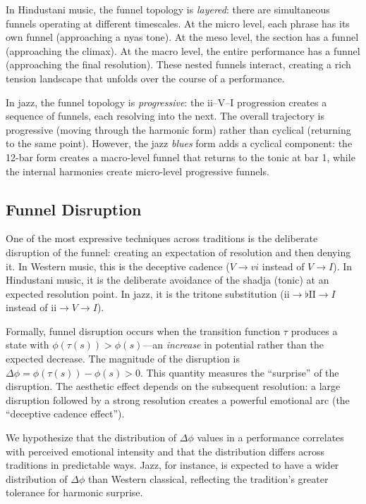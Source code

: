 \documentclass[cmj]{article}
\begin{document}
In Hindustani music, the funnel topology is \emph{layered}: there are
simultaneous funnels operating at different timescales. At the micro level,
each phrase has its own funnel (approaching a nyas tone). At the meso level,
the section has a funnel (approaching the climax). At the macro level, the
entire performance has a funnel (approaching the final resolution). These
nested funnels interact, creating a rich tension landscape that unfolds over
the course of a performance.

In jazz, the funnel topology is \emph{progressive}: the ii--V--I progression
creates a sequence of funnels, each resolving into the next. The overall
trajectory is progressive (moving through the harmonic form) rather than
cyclical (returning to the same point). However, the jazz \emph{blues} form
adds a cyclical component: the 12-bar form creates a macro-level funnel that
returns to the tonic at bar 1, while the internal harmonies create micro-level
progressive funnels.

\subsection{Funnel Disruption}

One of the most expressive techniques across traditions is the deliberate
disruption of the funnel: creating an expectation of resolution and then
denying it. In Western music, this is the deceptive cadence ($V \to vi$
instead of $V \to I$). In Hindustani music, it is the deliberate avoidance
of the shadja (tonic) at an expected resolution point. In jazz, it is the
tritone substitution ($\mathrm{ii} \to \mathrm{\flat II} \to I$ instead of
$\mathrm{ii} \to V \to I$).

Formally, funnel disruption occurs when the transition function $\tau$
produces a state with $\phi(\tau(s)) > \phi(s)$---an \emph{increase} in
potential rather than the expected decrease. The magnitude of the disruption
is $\Delta\phi = \phi(\tau(s)) - \phi(s) > 0$. This quantity measures the
``surprise'' of the disruption. The aesthetic effect depends on the subsequent
resolution: a large disruption followed by a strong resolution creates a
powerful emotional arc (the ``deceptive cadence effect'').

We hypothesize that the distribution of $\Delta\phi$ values in a performance
correlates with perceived emotional intensity and that the distribution differs
across traditions in predictable ways. Jazz, for instance, is expected to have
a wider distribution of $\Delta\phi$ than Western classical, reflecting the
tradition's greater tolerance for harmonic surprise.
\end{document}
